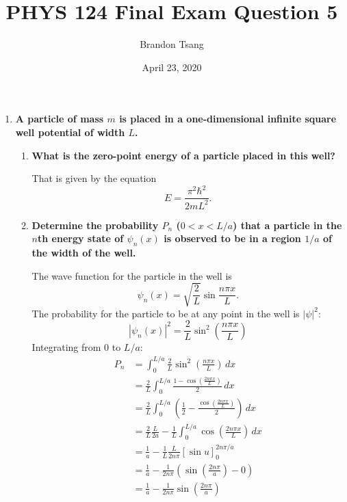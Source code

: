 \documentclass[11pt]{article}
\title{PHYS 124 Final Exam Question 5}
\author{Brandon Tsang}
\date{April 23, 2020}
\begin{document}
    \maketitle
    \begin{enumerate}[label=\textbf{\arabic*.}, start=5]
        \item{
            \textbf{\boldmath A particle of mass \(m\) is placed in a one-dimensional infinite square well potential of width \(L\).}
            \begin{enumerate}[label=\textbf{(\alph*)}]
                \item{
                    \textbf{What is the zero-point energy of a particle placed in this well?}
                    \par
                    That is given by the equation \[E=\frac{\pi^2\hbar^2}{2mL^2}.\]
                }
                \item{
                    \textbf{\boldmath Determine the probability \(P_n\) (\(0<x<L/a\)) that a particle in the \(n\)th energy state of \(\psi_n(x)\) is observed to be in a region \(1/a\) of the width of the well.}
                    \par
                    The wave function for the particle in the well is \[\psi_n(x)=\sqrt{\frac{2}{L}}\sin\frac{n\pi x}{L}.\]
                    The probability for the particle to be at any point in the well is \(|\psi|^2\):
                    \[|\psi_n(x)|^2=\frac{2}{L}\sin^2\left(\frac{n\pi x}{L}\right)\]
                    Integrating from 0 to \(L/a\):
                    \begin{align*}
                        P_n&=\int_0^{L/a}\frac{2}{L}\sin^2\left(\frac{n\pi x}{L}\right)\,dx \\
                        &=\frac{2}{L}\int_0^{L/a}\frac{1-\cos\left(\frac{2n\pi x}{L}\right)}{2}\,dx \\
                        &=\frac{2}{L}\int_0^{L/a}\left(\frac{1}{2}-\frac{\cos\left(\frac{2n\pi x}{L}\right)}{2}\right)\,dx \\
                        &=\frac{2}{L}\frac{L}{2a}-\frac{1}{L}\int_0^{L/a}\cos\left(\frac{2n\pi x}{L}\right)\,dx \\
                        &=\frac{1}{a}-\frac{1}{L}\frac{L}{2n\pi}\left[\sin u\right]_0^{2n\pi/a} \\
                        &=\frac{1}{a}-\frac{1}{2n\pi}\left(\sin\left(\frac{2n\pi}{a}\right)-0\right) \\
                        &=\frac{1}{a}-\frac{1}{2n\pi}\sin\left(\frac{2n\pi}{a}\right)

\end{align*}}
\end{enumerate}}
\end{enumerate}
\end{document}
